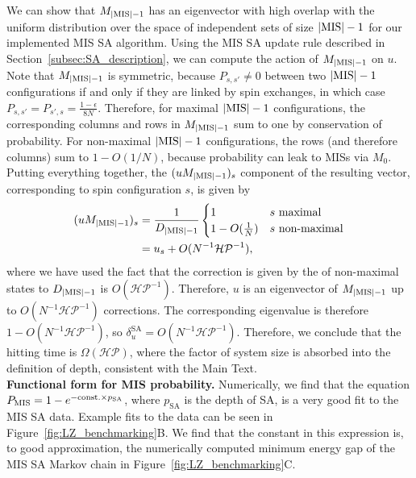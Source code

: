 \documentclass[twocolumn,amssymb,secnumarabic, prl, aps, nofootinbib]{revtex4-1}
\newcommand{\MIS}{\textnormal{MIS}}
\newcommand{\PMIS}{P_\textnormal{MIS}}
\newcommand{\DMISminusone}{D_{|\textnormal{MIS}|-1}}
\begin{document}
We can show that $M_{|\MIS| -1}$ has an eigenvector with high overlap with the uniform distribution over the space of independent sets of size $|\MIS|-1$ for our implemented MIS SA algorithm. Using the MIS SA update rule described in Section~\ref{subsec:SA_description}, we can compute the action of $M_{|\MIS| -1}$ on $u$. Note that $M_{|\MIS| -1}$ is symmetric, because $P_{s, s'}\neq 0$ between two $|\MIS| -1$ configurations if and only if they are linked by spin exchanges, in which case $P_{s, s'}=P_{s', s}=\frac{1-\epsilon}{8N}$. Therefore, for maximal $|\MIS| -1$ configurations, the corresponding columns and rows in $M_{|\MIS| -1}$ sum to one by conservation of probability. For non-maximal $|\MIS| -1$ configurations, the rows (and therefore columns) sum to $1-O(1/N)$, because probability can leak to MISs via $M_0.$  Putting everything together, the $(uM_{|\MIS| -1})_s$ component of the resulting vector, corresponding to spin configuration $s$, is given by
\begin{align}
	(uM_{|\MIS| -1})_s &= \frac{1}{{{\DMISminusone}}}\begin{cases} 1 & s \text{ maximal}\\
		1-O(\frac{1}{N}) & s \text{ non-maximal}
	\end{cases}\\
	&= u_s + O(N^{-1}\mathcal{HP}^{-1}),
\end{align}
where we have used the fact that the correction is given by the of non-maximal states to $\DMISminusone$ is $O(\mathcal{HP}^{-1})$. Therefore, $u$ is an eigenvector of $M_{|\MIS| -1}$ up to $O(N^{-1}\mathcal{HP}^{-1})$ corrections. 
The corresponding eigenvalue is therefore $1-O(N^{-1}\mathcal{HP}^{-1})$, so $\delta_{u}^{\text{SA}} = O(N^{-1}\mathcal{HP}^{-1})$. Therefore, we conclude that the hitting time is $\Omega(\mathcal{HP})$, where the factor of system size is absorbed into the definition of depth, consistent with the Main Text.  \\ 

\noindent\textbf{Functional form for MIS probability. }
Numerically, we find that the equation $\PMIS=1-e^{-\text{const.}\times p_{\text{SA}}}$, where $p_{\text{SA}}$ is the depth of SA, is a very good fit to the MIS SA data. Example fits to the data can be seen in Figure~\ref{fig:LZ_benchmarking}B. We find that the constant in this expression is, to good approximation, the numerically computed minimum energy gap of the MIS SA Markov chain in Figure~\ref{fig:LZ_benchmarking}C.
\end{document}
